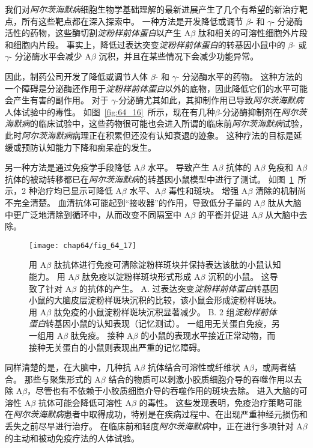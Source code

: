 我们对\textit{阿尔茨海默病}细胞生物学基础理解的最新进展产生了几个有希望的新治疗靶点，所有这些靶点都在深入探索中。
一种方法是开发降低或调节 $\beta$- 和 $\gamma$- 分泌酶活性的药物，这些酶切割\textit{淀粉样前体蛋白}以产生 A$\beta$ 肽和相关的可溶性细胞外片段和细胞内片段。
事实上，降低过表达突变\textit{淀粉样前体蛋白}的转基因小鼠中的 $\beta$- 或 $\gamma$- 分泌酶水平会减少 A$\beta$ 沉积，并且在某些情况下会减少功能异常。


因此，制药公司开发了降低或调节人体 $\beta$- 和 $\gamma$- 分泌酶水平的药物。
这种方法的一个障碍是分泌酶还作用于\textit{淀粉样前体蛋白}以外的底物，因此降低它们的水平可能会产生有害的副作用。
对于 $\gamma$-分泌酶尤其如此，其抑制作用已导致\textit{阿尔茨海默病}人体试验中的毒性。
如图~\ref{fig:64_16}~所示，现在有几种$\beta$-分泌酶抑制剂在\textit{阿尔茨海默病}的临床试验中，这些药物很可能也会进入所谓的临床前\textit{阿尔茨海默病}试验，此时\textit{阿尔茨海默病}病理正在积累但还没有认知衰退的迹象。
这种疗法的目标是延缓或预防认知能力下降和痴呆症的发生。


另一种方法是通过免疫学手段降低 A$\beta$ 水平。
导致产生 A$\beta$ 抗体的 A$\beta$ 免疫和 A$\beta$ 抗体的被动转移都已在\textit{阿尔茨海默病}的转基因小鼠模型中进行了测试。
如图~\ref{fig:64_17}~所示，2 种治疗均已显示可降低 A$\beta$ 水平、A$\beta$ 毒性和斑块。
增强 A$\beta$ 清除的机制尚不完全清楚。
血清抗体可能起到“接收器”的作用，导致低分子量的 A$\beta$ 肽从大脑中更广泛地清除到循环中，从而改变不同隔室中 A$\beta$ 的平衡并促进 A$\beta$ 从大脑中去除。


\begin{figure}[htbp]
	\centering
	\texttt{[image: chap64/fig\_64\_17]}
	\caption{用 A$\beta$ 肽抗体进行免疫可清除淀粉样斑块并保持表达该肽的小鼠认知能力。
		用 A$\beta$ 肽免疫以淀粉样斑块形式形成 A$\beta$ 沉积的小鼠。
		这导致了针对 A$\beta$ 的抗体的产生。
		A. 过表达突变\textit{淀粉样前体蛋白}转基因小鼠的大脑皮层淀粉样斑块沉积的比较，该小鼠会形成淀粉样斑块。
		用 A$\beta$ 肽免疫的小鼠淀粉样斑块沉积显著减少\cite{brody2008active}。
		B. 2 组\textit{淀粉样前体蛋白}转基因小鼠的认知表现（记忆测试）。
		一组用无关蛋白免疫，另一组用 A$\beta$ 肽免疫。
		接种 A$\beta$ 的小鼠的表现水平接近正常动物，而接种无关蛋白的小鼠则表现出严重的记忆障碍\cite{janus2000abeta}。}
	\label{fig:64_17}
\end{figure}


同样清楚的是，在大脑中，几种抗 A$\beta$ 抗体结合可溶性或纤维状 A$\beta$，或两者结合。
那些与聚集形式的 A$\beta$ 结合的物质可以刺激小胶质细胞介导的吞噬作用以去除 A$\beta$，尽管也有不依赖于小胶质细胞介导的吞噬作用的斑块去除。
进入大脑的可溶性 A$\beta$ 抗体可能会降低可溶性 A$\beta$ 的毒性。
这些发现表明，免疫治疗策略可能在\textit{阿尔茨海默病}患者中取得成功，特别是在疾病过程中、在出现严重神经元损伤和丢失之前尽早进行治疗。
在临床前和轻度\textit{阿尔茨海默病}中，正在进行多项针对 A$\beta$ 的主动和被动免疫疗法的人体试验。


